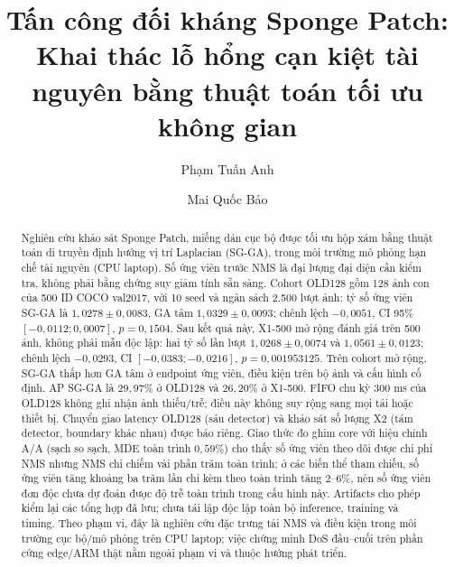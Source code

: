 \documentclass[a4paper,fleqn]{cas-dc}
\begin{document}
\let\WriteBookmarks\relax
\def\floatpagepagefraction{1}
\def\textpagefraction{.001}
\title[mode=title]{Tấn công đối kháng Sponge Patch: Khai thác lỗ hổng cạn kiệt tài nguyên bằng thuật toán tối ưu không gian}
\author[1]{Phạm Tuấn Anh}
\author[1]{Mai Quốc Bảo}

\begin{abstract}
Nghiên cứu khảo sát Sponge Patch, miếng dán cục bộ được tối ưu hộp xám bằng thuật toán di truyền định hướng vị trí Laplacian (SG-GA), trong môi trường mô phỏng hạn chế tài nguyên (CPU laptop). Số ứng viên trước NMS là đại lượng đại diện cần kiểm tra, không phải bằng chứng suy giảm tính sẵn sàng. Cohort OLD128 gồm 128 ảnh con của 500 ID COCO val2017, với 10 seed và ngân sách 2.500 lượt ảnh: tỷ số ứng viên SG-GA là $1{,}0278\pm0{,}0083$, GA tâm $1{,}0329\pm0{,}0093$; chênh lệch $-0{,}0051$, CI 95\% $[-0{,}0112;0{,}0007]$, $p=0{,}1504$. Sau kết quả này, X1-500 mở rộng đánh giá trên 500 ảnh, không phải mẫu độc lập: hai tỷ số lần lượt $1{,}0268\pm0{,}0074$ và $1{,}0561\pm0{,}0123$; chênh lệch $-0{,}0293$, CI $[-0{,}0383;-0{,}0216]$, $p=0{,}001953125$. Trên cohort mở rộng, SG-GA thấp hơn GA tâm ở endpoint ứng viên, điều kiện trên bộ ảnh và cấu hình cố định. AP SG-GA là $29{,}97\%$ ở OLD128 và $26{,}20\%$ ở X1-500. FIFO chu kỳ 300 ms của OLD128 không ghi nhận ảnh thiếu/trễ; điều này không suy rộng sang mọi tải hoặc thiết bị. Chuyển giao latency OLD128 (sáu detector) và khảo sát số lượng X2 (tám detector, boundary khác nhau) được báo riêng. Giao thức đo ghim core với hiệu chỉnh A/A (sạch so sạch, MDE toàn trình $0{,}59\%$) cho thấy số ứng viên theo dõi được chi phí NMS nhưng NMS chỉ chiếm vài phần trăm toàn trình; ở các biến thể tham chiếu, số ứng viên tăng khoảng ba trăm lần chỉ kèm theo toàn trình tăng $2$--$6\%$, nên số ứng viên đơn độc chưa dự đoán được độ trễ toàn trình trong cấu hình này. Artifacts cho phép kiểm lại các tổng hợp đã lưu; chưa tái lập độc lập toàn bộ inference, training và timing. Theo phạm vi, đây là nghiên cứu đặc trưng tải NMS và điều kiện trong môi trường cục bộ/mô phỏng trên CPU laptop; việc chứng minh DoS đầu--cuối trên phần cứng edge/ARM thật nằm ngoài phạm vi và thuộc hướng phát triển.
\end{abstract}
\end{document}
